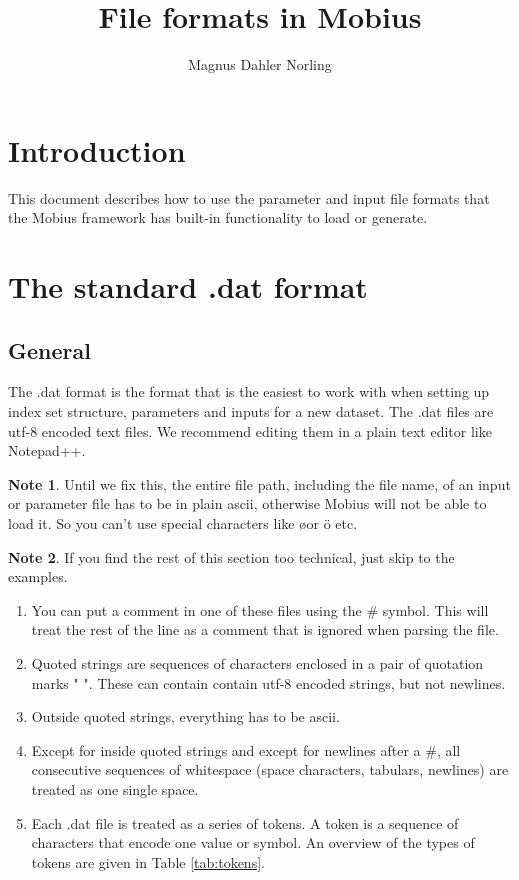 \documentclass[11pt]{article}
\title{File formats in Mobius}
\author{Magnus Dahler Norling}
\theoremstyle{definition}
\newtheorem{mynote}{Note}
\newenvironment{note}%
  {\begin{lrbox}{\notebox}%
   \begin{minipage}{\dimexpr\linewidth-2\fboxsep}
   \begin{mynote}}%
  {\end{mynote}%
   \end{minipage}%
   \end{lrbox}%
   \begin{trivlist}
     \item[]\colorbox{silver}{\usebox\notebox}
   \end{trivlist}}
\begin{document}
\maketitle

\tableofcontents

\section{Introduction}

This document describes how to use the parameter and input file formats that the Mobius framework has built-in functionality to load or generate.

\section{The standard .dat format}

\subsection{General}
The .dat format is the format that is the easiest to work with when setting up index set structure, parameters and inputs for a new dataset. The .dat files are utf-8 encoded text files. We recommend editing them in a plain text editor like Notepad++.

\begin{note}
Until we fix this, the entire file path, including the file name, of an input or parameter file has to be in plain ascii, otherwise Mobius will not be able to load it. So you can't use special characters like \o or \"{o} etc.
\end{note}

\begin{note}
If you find the rest of this section too technical, just skip to the examples.
\end{note}

\begin{enumerate}[i]
\item You can put a comment in one of these files using the \# symbol. This will treat the rest of the line as a comment that is ignored when parsing the file.
\item Quoted strings are sequences of characters enclosed in a pair of quotation marks " ". These can contain contain utf-8 encoded strings, but not newlines.
\item Outside quoted strings, everything has to be ascii.
\item Except for inside quoted strings and except for newlines after a \#, all consecutive sequences of whitespace (space characters, tabulars, newlines) are treated as one single space.
\item Each .dat file is treated as a series of tokens. A token is a sequence of characters that encode one value or symbol. An overview of the types of tokens are given in Table \ref{tab:tokens}.
\end{enumerate}
\end{document}
